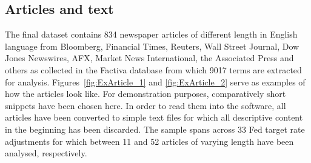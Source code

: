 \subsection{Articles and text}
The final dataset contains 834 newspaper articles of different length in English language from Bloomberg, Financial Times, Reuters, Wall Street Journal, Dow Jones Newswires, AFX, Market News International, the Associated Press and others as collected in the Factiva database from which 9017 terms are extracted for analysis. Figures~\vref{fig:ExArticle_1} and \vref{fig:ExArticle_2} serve as examples of how the articles look like. For demonstration purposes, comparatively short snippets have been chosen here. In order to read them into the software, all articles have been converted to simple text files for which all descriptive content in the beginning has been discarded. The sample spans across 33 Fed target rate adjustments for which between 11 and 52 articles of varying length have been analysed, respectively.
%

